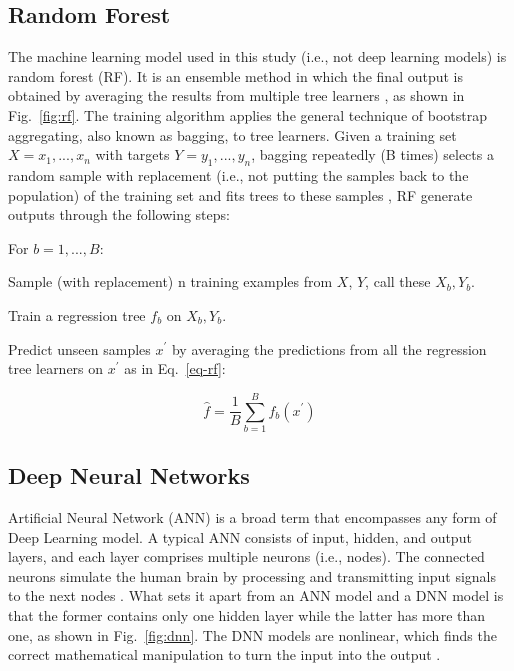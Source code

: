 \subsection{Random Forest}
The machine learning model used in this study (i.e., not deep learning models) is random forest (RF). It is an ensemble method in which the final output is obtained by averaging the results from multiple tree learners \citep{wangMachineLearningFramework2021}, as shown in Fig.~\ref{fig:rf}. The training algorithm applies the general technique of bootstrap aggregating, also known as bagging, to tree learners. Given a training set $X = x_1, ..., x_n$ with targets $Y = y_1, ..., y_n$, bagging repeatedly (B times) selects a random sample with replacement (i.e., not putting the samples back to the population) of the training set and fits trees to these samples \citep{wikipediaRandomForest2022}, RF generate outputs through the following steps:

For $b=1, ..., B:$

\noindent
\begin{myenumerate}
  \item Sample (with replacement) n training examples from $X$, $Y$, call these $X_b, Y_b$.
  \item Train a regression tree $f_b$ on $X_b, Y_b$.
  \item Predict unseen samples $x^{'}$ by averaging the predictions from all the regression tree learners on $x^{'}$ as in Eq.~\ref{eq-rf}:
\end{myenumerate}

\begin{equation}\label{eq-rf}
  \hat{f}=\frac{1}{B}\sum_{b=1}^{B}f_b(x^{'})
\end{equation}

\subsection{Deep Neural Networks}
Artificial Neural Network (ANN) is a broad term that encompasses any form of Deep Learning model. A typical ANN consists of input, hidden, and output layers, and each layer comprises multiple neurons (i.e., nodes). The connected neurons simulate the human brain by processing and transmitting input signals to the next nodes \citep{mohseni-dargahChapter12Machine2022}. What sets it apart from an ANN model and a DNN model is that the former contains only one hidden layer while the latter has more than one, as shown in Fig.~\ref{fig:dnn}. The DNN models are nonlinear, which finds the correct mathematical manipulation to turn the input into the output \citep{bangaloreaiDeepNeuralNetwork2018}.

